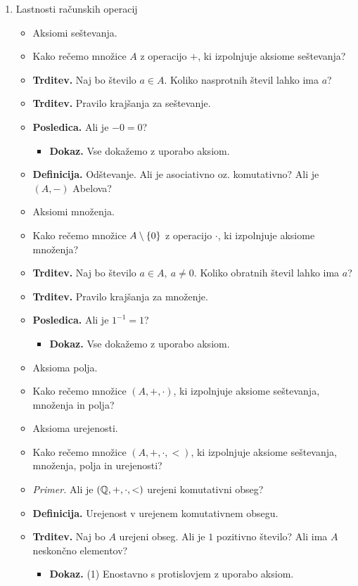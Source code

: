 \begin{enumerate}
    \item Lastnosti računskih operacij
    \begin{itemize}
        \item Aksiomi seštevanja.
        \item Kako rečemo množice $A$ z operacijo $+$, ki izpolnjuje aksiome seštevanja?
        \item \colorbox{blue!30}{\textbf{Trditev.}} Naj bo število $a \in A$. Koliko nasprotnih števil lahko ima $a$?
        \item \colorbox{blue!30}{\textbf{Trditev.}} Pravilo krajšanja za seštevanje.        
        \item \colorbox{orange!30}{\textbf{Posledica.}} Ali je $-0 = 0$?
        \begin{itemize}
            \item \colorbox{green!30}{\textbf{Dokaz.}} Vse dokažemo z uporabo aksiom.
        \end{itemize}
        \item \colorbox{purple!30}{\textbf{Definicija.}} Odštevanje. Ali je asociativno oz. komutativno? Ali je $(A, -)$ Abelova?
        \item Aksiomi množenja.
        \item Kako rečemo množice $A \setminus \left\{0\right\}$ z operacijo $\cdot$, ki izpolnjuje aksiome množenja?
        \item \colorbox{blue!30}{\textbf{Trditev.}} Naj bo število $a \in A, \ a \neq 0$. Koliko obratnih števil lahko ima $a$?
        \item \colorbox{blue!30}{\textbf{Trditev.}} Pravilo krajšanja za množenje. 
        \item \colorbox{orange!30}{\textbf{Posledica.}} Ali je $1^{-1} = 1$?
        \begin{itemize}
            \item \colorbox{green!30}{\textbf{Dokaz.}} Vse dokažemo z uporabo aksiom.
        \end{itemize}
        \item Aksioma polja.
        \item Kako rečemo množice $(A, +, \cdot)$, ki izpolnjuje aksiome seštevanja, množenja in polja?
        \item Aksioma urejenosti.
        \item Kako rečemo množice $(A, +, \cdot, <)$, ki izpolnjuje aksiome seštevanja, množenja, polja in urejenosti?
        \item \colorbox{yellow!30}{\emph{Primer.}} Ali je $(\mathbb{Q}, +, \cdot, <)$ urejeni komutativni obseg?
        \item \colorbox{purple!30}{\textbf{Definicija.}} Urejenost v urejenem komutativnem obsegu.
        \item \colorbox{blue!30}{\textbf{Trditev.}} Naj bo $A$ urejeni obseg. Ali je $1$ pozitivno število? Ali ima $A$ neskončno elementov?
        \begin{itemize}
            \item \colorbox{green!30}{\textbf{Dokaz.}} (1) Enostavno s protislovjem z uporabo aksiom.
            

\end{itemize}
\end{itemize}
\end{enumerate}

